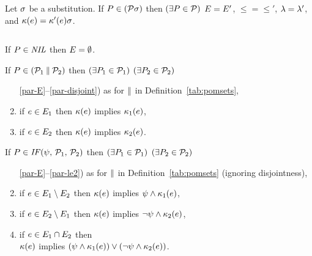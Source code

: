 \begin{definition}
  Let $\aSub$ be a substitution.  If $\aPS\in(\aPSS\aSub)$ then
  $(\exists\aPS\in\aPSS)$ $\Event = \Event'$, ${\le} = {\le'}$,
  $\labelingAct = \labelingAct'$, and
  $\labelingForm(\aEv) = \labelingForm'(\aEv)\aSub$.
\end{definition}

\begin{definition}$\phantom{\;}$\par
  \label{tab:pomsets-pre}
  
  \noindent
  If $\aPS\SB0\in\sNIL$ then $\aEvs\SB0 = \emptyset$.

  \noindent
  If $\aPS\SB0 \in (\aPSS_1\sPAR\aPSS_2)$ then
  $(\exists\aPS_1\in\aPSS_1)$ $(\exists\aPS_2\in\aPSS_2)$
  \begin{enumerate}
    \setcounter{enumi}{\value{pomsetParDisjointCount}}
  \item[\ref{par-E}--\ref{par-disjoint})]
    as for $\sPAR$ in Definition~\ref{tab:pomsets},
  \item \label{par-kappa1}
    if $\aEv\in\aEvs_1$ then $\labelingForm\SB0(\aEv)$ implies $\labelingForm_1(\aEv)$,
  \item \label{par-kappa2}
    if $\aEv\in\aEvs_2$ then $\labelingForm\SB0(\aEv)$ implies $\labelingForm_2(\aEv)$.
    \setcounter{pomsetPreParCount}{\value{enumi}}
  \end{enumerate}

  \noindent
  If $\aPS\SB0 \in \sIF{\bForm}\sTHEN\aPSS_1\sELSE\aPSS_2\sFI$ then
  $(\exists\aPS_1\in\aPSS_1)$ $(\exists\aPS_2\in\aPSS_2)$
  \begin{enumerate}
    \setcounter{enumi}{\value{pomsetParCount}}
  \item[\ref{par-E}--\ref{par-le2})] 
    as for $\sPAR$  in Definition~\ref{tab:pomsets} (ignoring disjointness),
  \item \label{if-kappa1}
    if $\aEv\in\aEvs_1\setminus\aEvs_2$ then $\labelingForm\SB0(\aEv)$ implies $\bForm\land\labelingForm_1(\aEv)$,
  \item \label{if-kappa2}
    if $\aEv\in\aEvs_2\setminus\aEvs_1$ then $\labelingForm\SB0(\aEv)$ implies $\neg\bForm\land\labelingForm_2(\aEv)$, 
  \item \label{if-kappa12}
    if $\aEv\in\aEvs_1\cap\aEvs_2$ then\\ $\labelingForm\SB0(\aEv)$ implies $(\bForm\land\labelingForm_1(\aEv))\lor(\neg\bForm\land\labelingForm_2(\aEv))$.
    \setcounter{pomsetPreIfCount}{\value{enumi}}
  \end{enumerate}


\end{definition}
